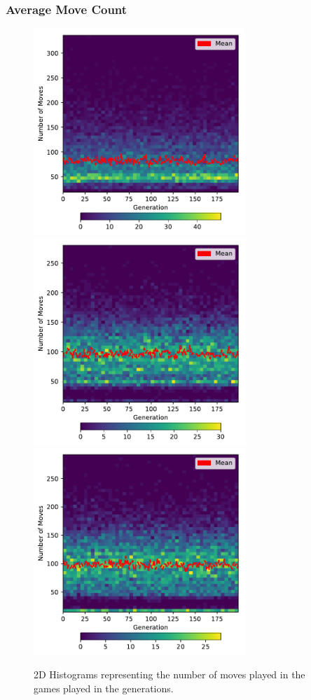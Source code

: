 \documentclass{beamer}
\begin{document}
  \begin{frame}
    \frametitle{Average Move Count} 
    \begin{figure}[!ht]
      \centering
      \includegraphics[width=80mm]{images/results/1ply/moves.pdf}
      \includegraphics[width=80mm]{images/results/3ply/moves.pdf}
      \includegraphics[width=80mm]{images/results/6ply/moves.pdf}
      \caption{2D Histograms representing the number of moves played in the games played in the generations. \label{move_chart}}
  \end{figure}

  \end{frame}
\end{document}
